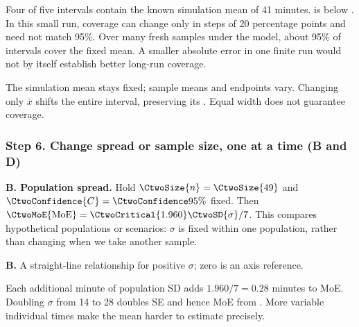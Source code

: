 Four of five intervals contain the known simulation mean of 41 minutes.
 is  below .
In this small run, coverage can change only in steps of 20 percentage points and need not match 95\%.
Over many fresh samples under the model, about 95\% of intervals cover the fixed mean.
A smaller absolute error in one finite run would not by itself establish better long-run coverage.

The simulation mean stays fixed; sample means and endpoints vary.
Changing only $\bar{x}$ shifts the entire interval, preserving its
. Equal width does not guarantee coverage.
\par\vspace{3mm}

\clearpage
\subsubsection*{Step 6. Change spread or sample size, one at a time (B and D)}
\textbf{B. Population spread.} Hold $\CtwoSize{n}=\CtwoSize{49}$ and
$\CtwoConfidence{C}=\CtwoConfidence{95\%}$ fixed. Then
$\CtwoMoE{\mathrm{MoE}}=\CtwoCritical{1.960}\CtwoSD{\sigma}/7$.
This compares hypothetical populations or scenarios: $\sigma$ is fixed within
one population, rather than changing when we take another sample.
\begin{center}
\par\small\textbf{B.} A straight-line relationship for positive $\sigma$; zero is an axis reference.
\end{center}
Each additional minute of population SD adds $1.960/7=0.28$ minutes to MoE.
Doubling $\sigma$ from 14 to 28 doubles SE and hence MoE from
. More variable individual times make the mean harder to estimate precisely.

